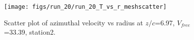 \begin{figure}[H]
\centering
\texttt{[image: figs/run\_20/run\_20\_T\_vs\_r\_meshscatter]}
\caption{Scatter plot of azimuthal velocity vs radius at $z/c$=6.97, $V_{free}$=33.39, station2.}
\label{fig:run_20_T_vs_r_meshscatter}
\end{figure}


